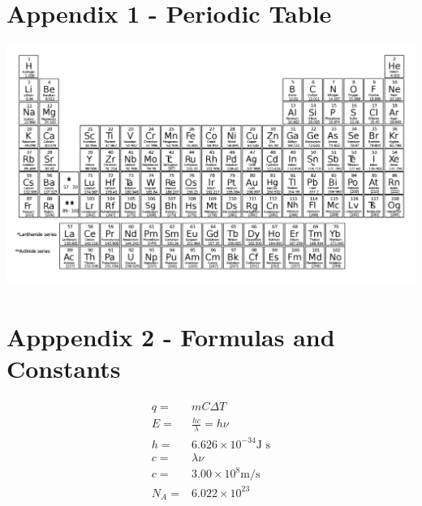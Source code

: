 \documentclass[12pt]{exam}		%
\begin{document}
\newpage

\appendix

\section{Appendix 1 - Periodic Table}

\begin{center}
  \includegraphics[scale=0.24,angle=90]{periodic_table}
\end{center}

\section{Apppendix 2 - Formulas and Constants}

\begin{align*}
  q = & mC\Delta T \\
  E = & \frac{hc}{\lambda} = h\nu \\
  h = & 6.626 \times 10^{-34} \text{J s} \\
  c = & \lambda \nu \\
  c = & 3.00 \times 10^8 \text{m/s} \\
  N_A = & 6.022\times 10^{23}
\end{align*}
\end{document}
